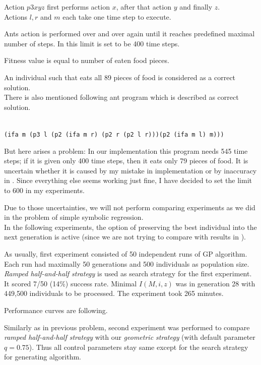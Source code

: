 \documentclass[12pt,a4paper]{report}
\begin{document}
Action $p3 x y z$ first performs action $x$, after that action $y$ and finally $z$.\\

Actions $l, r$ and $m$ each take one time step to execute.

Ants action is performed over and over again until it reaches predefined
maximal number of steps. In \cite{koza92} this limit is set to be 400 time steps.

Fitness value is equal to number of eaten food pieces.

An individual such that eats all 89 pieces of food is 
considered as a correct solution.\\

There is also mentioned following ant program which is described as correct solution.

\texttt{~\\
(ifa m (p3 l (p2 (ifa m r) (p2 r (p2 l r)))(p2 (ifa m l) m)))\\
} 

But here arises a problem: In our implementation this program needs 545
time steps; if it is given only 400 time steps, then it eats only 79 pieces
of food. It is uncertain whether it is caused by my mistake in implementation
or by inaccuracy in \cite{koza92}. Since everything else seems working just 
fine, I have decided to set the limit to 600 in my experiments.

Due to those uncertainties, we will not perform comparing experiments 
as we did in the problem of simple symbolic regression.\\

In the following experiments, the option of preserving the best individual 
into the next generation is active (since we are not trying to compare 
with results in \cite{koza92}).





As usually, first experiment consisted of 50 independent runs of GP algorithm.
Each run had maximally 50 generations and 500 individuals as population size.
\textit{Ramped half-and-half strategy} is used as search strategy for the first 
experiment.\\


It scored 7/50 (14\%) success rate. 
Minimal $I(M,i,z)$ was in generation 28 
with 449,500 individuals to be processed.
The experiment took 265 minutes.

Performance curves are following.

Similarly as in previous problem, second experiment was performed to compare 
\textit{ramped half-and-half strategy} with our
\textit{geometric strategy} (with default parameter $q=0.75$). 
Thus all control parameters stay same except for the 
search strategy for generating algorithm.
\end{document}
